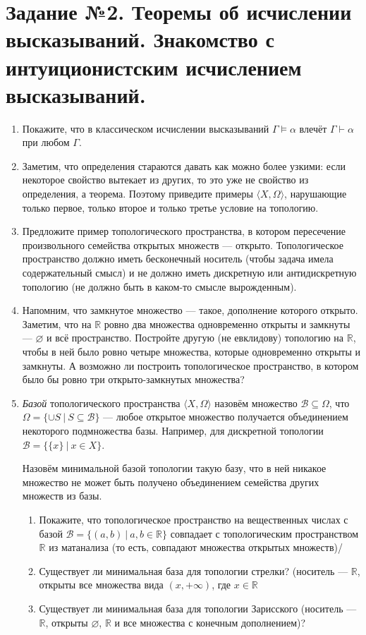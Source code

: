 \documentclass[10pt,a4paper,oneside]{article}
\begin{document}
\section*{Задание №2. Теоремы об исчислении высказываний. Знакомство с интуиционистским исчислением высказываний.}
\begin{enumerate}
\item Покажите, что в классическом исчислении высказываний $\Gamma \models \alpha$ влечёт $\Gamma \vdash \alpha$ при любом $\Gamma$.

\item Заметим, что определения стараются давать как можно более узкими: если некоторое свойство вытекает из других, то это уже не 
свойство из определения, а теорема.
Поэтому приведите примеры $\langle X, \Omega\rangle$, нарушающие только первое, только второе и только третье условие на топологию.

\item Предложите пример топологического пространства, в котором пересечение произвольного семейства открытых множеств --- открыто.
Топологическое пространство должно иметь бесконечный носитель (чтобы задача имела содержательный смысл) и не должно иметь дискретную 
или антидискретную топологию (не должно быть в каком-то смысле вырожденным).

\item Напомним, что замкнутое множество --- такое, дополнение которого открыто.
Заметим, что на $\mathbb{R}$ ровно два множества одновременно открыты и замкнуты --- $\varnothing$ и всё пространство. Постройте другую
(не евклидову) топологию на $\mathbb{R}$, чтобы в ней было ровно четыре множества, которые одновременно открыты и замкнуты. А возможно ли построить
топологическое пространство, в котором было бы ровно три открыто-замкнутых множества?

\item \emph{Базой} топологического пространства $\langle X,\Omega \rangle$ назовём множество $\mathcal{B}\subseteq\Omega$,
что $\Omega = \{ \cup S\ |\ S\subseteq\mathcal{B}\}$ --- любое открытое множество получается объединением некоторого подмножества
базы. Например, для дискретной топологии $\mathcal{B}=\{\{x\}\ |\ x \in X\}$.

Назовём минимальной базой топологии такую базу, что в ней никакое множество не может быть получено объединением семейства других множеств из базы. 

\begin{enumerate}
\item Покажите, что топологическое пространство на вещественных числах с базой $\mathcal{B} = \{(a,b)\ |\ a,b \in \mathbb{R}\}$ совпадает
с топологическим пространством $\mathbb{R}$ из матанализа (то есть, совпадают множества открытых множеств)/
\item Существует ли минимальная база для топологии стрелки? (носитель --- $\mathbb{R}$, открыты все множества вида $(x, +\infty)$, где $x \in \mathbb{R}$
\item Существует ли минимальная база для топологии Зарисского (носитель --- $\mathbb{R}$, открыты $\varnothing$, $\mathbb{R}$ и все множества с конечным дополнением)?
\end{enumerate}


\end{enumerate}
\end{document}
